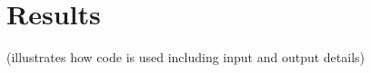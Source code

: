 \section{Results} %
\label{sec:results}
(illustrates how code is used including input and output details)
